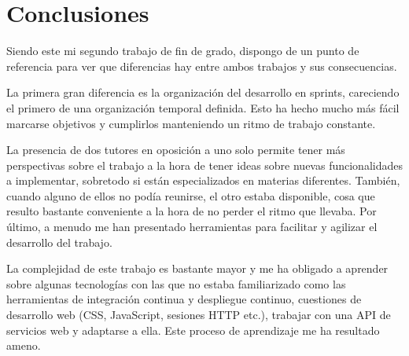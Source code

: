 \section{Conclusiones}
	Siendo este mi segundo trabajo de fin de grado, dispongo de un punto de referencia para ver que diferencias hay entre ambos trabajos y sus consecuencias.
	
	La primera gran diferencia es la organización del desarrollo en sprints, careciendo el primero de una organización temporal definida. Esto ha hecho mucho más fácil marcarse objetivos y cumplirlos manteniendo un ritmo de trabajo constante.
	
	La presencia de dos tutores en oposición a uno solo permite tener más perspectivas sobre el trabajo a la hora de tener ideas sobre nuevas funcionalidades a implementar, sobretodo si están especializados en materias diferentes. También, cuando alguno de ellos no podía reunirse, el otro estaba disponible, cosa que resulto bastante conveniente a la hora de no perder el ritmo que llevaba. Por último, a menudo me han presentado herramientas para facilitar y agilizar el desarrollo del trabajo.
	
	La complejidad de este trabajo es bastante mayor y me ha obligado a aprender sobre algunas tecnologías con las que no estaba familiarizado como las herramientas de integración continua y despliegue continuo, cuestiones de desarrollo web (CSS, JavaScript, sesiones HTTP etc.), trabajar con una API de servicios web y adaptarse a ella. Este proceso de aprendizaje me ha resultado ameno.


